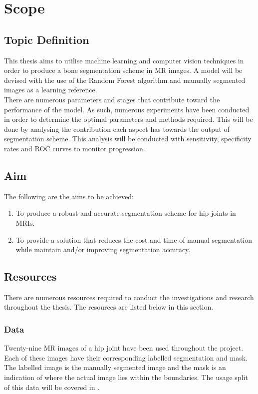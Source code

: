 \chapter{Scope}
\section{Topic Definition}
This thesis aims to utilise machine learning and computer vision techniques in order to produce a bone segmentation scheme in MR images.
A model will be devised with the use of the Random Forest algorithm and manually segmented images as a learning reference. 
\\[1\baselineskip]
There are numerous parameters and stages that contribute toward the performance of the model. As such, numerous experiments have been conducted in order to determine the optimal parameters and methods required. This will be done by analysing the contribution each aspect has towards the output of segmentation scheme. This analysis will be conducted with sensitivity, specificity rates and ROC curves to monitor progression. 

\section{Aim}
The following are the aims to be achieved:
\begin{enumerate}
	\item To produce a robust and accurate segmentation scheme for hip joints in MRIs.
	\item To provide a solution that reduces the cost and time of manual segmentation while maintain and/or improving segmentation accuracy.
\end{enumerate}
\section{Resources}
There are numerous resources required to conduct the investigations and research throughout the thesis. The resources are listed below in this section. 
\subsection{Data}
Twenty-nine MR images of a hip joint have been used throughout the project. Each of these images have their corresponding labelled segmentation and mask. The labelled image is the manually segmented image and the mask is an indication of where the actual image lies within the boundaries. The usage split of this data will be covered in .
